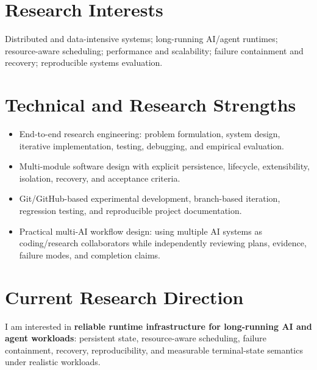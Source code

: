 \documentclass[10pt,a4paper]{article}
\begin{document}
\section{Research Interests}
Distributed and data-intensive systems; long-running AI/agent runtimes; resource-aware scheduling; performance and scalability; failure containment and recovery; reproducible systems evaluation.

\section{Technical and Research Strengths}
\begin{itemize}
  \item End-to-end research engineering: problem formulation, system design, iterative implementation, testing, debugging, and empirical evaluation.
  \item Multi-module software design with explicit persistence, lifecycle, extensibility, isolation, recovery, and acceptance criteria.
  \item Git/GitHub-based experimental development, branch-based iteration, regression testing, and reproducible project documentation.
  \item Practical multi-AI workflow design: using multiple AI systems as coding/research collaborators while independently reviewing plans, evidence, failure modes, and completion claims.
\end{itemize}

\section{Current Research Direction}
I am interested in \textbf{reliable runtime infrastructure for long-running AI and agent workloads}: persistent state, resource-aware scheduling, failure containment, recovery, reproducibility, and measurable terminal-state semantics under realistic workloads.
\end{document}
